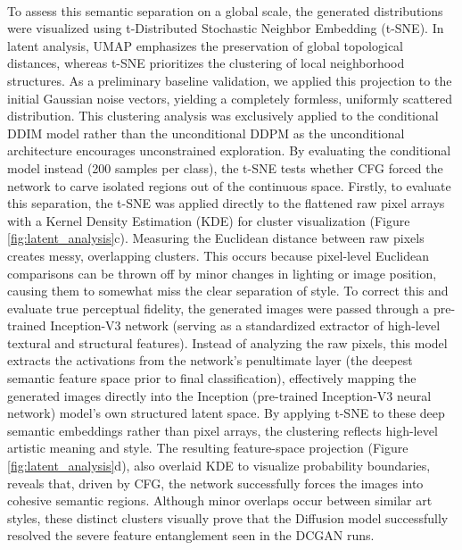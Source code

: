 \documentclass[runningheads]{llncs}
\begin{document}
\noindent
\\
To assess this semantic separation on a global scale, the generated distributions were visualized using t-Distributed Stochastic Neighbor Embedding (t-SNE). In latent analysis, UMAP emphasizes the preservation of global topological distances, whereas t-SNE prioritizes the clustering of local neighborhood structures. As a preliminary baseline validation, we applied this projection to the initial Gaussian noise vectors, yielding a completely formless, uniformly scattered distribution. This clustering analysis was exclusively applied to the conditional DDIM model rather than the unconditional DDPM as the unconditional architecture encourages unconstrained exploration. By evaluating the conditional model instead (200 samples per class), the t-SNE tests whether CFG forced the network to carve isolated regions out of the continuous space. Firstly, to evaluate this separation, the t-SNE was applied directly to the flattened raw pixel arrays with a Kernel Density Estimation (KDE) for cluster visualization (Figure \ref{fig:latent_analysis}c). Measuring the Euclidean distance between raw pixels creates messy, overlapping clusters. This occurs because pixel-level Euclidean comparisons can be thrown off by minor changes in lighting or image position, causing them to somewhat miss the clear separation of style. To correct this and evaluate true perceptual fidelity, the generated images were passed through a pre-trained Inception-V3 network (serving as a standardized extractor of high-level textural and structural features). Instead of analyzing the raw pixels, this model extracts the activations from the network's penultimate layer (the deepest semantic feature space prior to final classification), effectively mapping the generated images directly into the Inception (pre-trained Inception-V3 neural network) model's own structured latent space. By applying t-SNE to these deep semantic embeddings rather than pixel arrays, the clustering reflects high-level artistic meaning and style. The resulting feature-space projection (Figure \ref{fig:latent_analysis}d), also overlaid KDE to visualize probability boundaries, reveals that, driven by CFG, the network successfully forces the images into cohesive semantic regions. Although minor overlaps occur between similar art styles, these distinct clusters visually prove that the Diffusion model successfully resolved the severe feature entanglement seen in the DCGAN runs.
\end{document}
